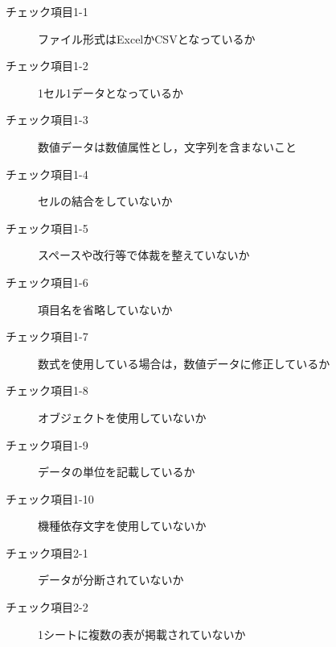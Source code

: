 \begin{description}
	\item[チェック項目1-1] ファイル形式はExcelかCSVとなっているか
	\item[チェック項目1-2] 1セル1データとなっているか
	\item[チェック項目1-3] 数値データは数値属性とし，文字列を含まないこと
	\item[チェック項目1-4] セルの結合をしていないか
	\item[チェック項目1-5] スペースや改行等で体裁を整えていないか
	\item[チェック項目1-6] 項目名を省略していないか
	\item[チェック項目1-7] 数式を使用している場合は，数値データに修正しているか
	\item[チェック項目1-8] オブジェクトを使用していないか
	\item[チェック項目1-9] データの単位を記載しているか
	\item[チェック項目1-10] 機種依存文字を使用していないか
	\item[チェック項目2-1] データが分断されていないか
	\item[チェック項目2-2] 1シートに複数の表が掲載されていないか
\end{description}

